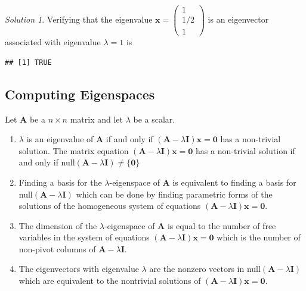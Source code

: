 \documentclass[
]{book}
\newenvironment{Shaded}{\begin{snugshade}}{\end{snugshade}}
\newcommand{\CommentTok}[1]{\textcolor[rgb]{0.56,0.35,0.01}{\textit{#1}}}
\newcommand{\DecValTok}[1]{\textcolor[rgb]{0.00,0.00,0.81}{#1}}
\newcommand{\KeywordTok}[1]{\textcolor[rgb]{0.13,0.29,0.53}{\textbf{#1}}}
\newcommand{\NormalTok}[1]{#1}
\newcommand{\OperatorTok}[1]{\textcolor[rgb]{0.81,0.36,0.00}{\textbf{#1}}}
\newcommand{\StringTok}[1]{\textcolor[rgb]{0.31,0.60,0.02}{#1}}
\theoremstyle{definition}
\theoremstyle{definition}
\theoremstyle{definition}
\theoremstyle{definition}
\theoremstyle{remark}
\newtheorem*{solution}{Solution}
\begin{document}
\begin{solution}
Verifying that the eigenvalue \(\mathbf{x} = \begin{pmatrix} 1 \\ 1/2 \\ 1 \end{pmatrix}\) is an eigenvector associated with eigenvalue \(\lambda = 1\) is

\begin{Shaded}
\end{Shaded}

\begin{verbatim}
## [1] TRUE
\end{verbatim}

\end{solution}

\hypertarget{computing-eigenspaces}{%
\subsection{Computing Eigenspaces}\label{computing-eigenspaces}}

Let \(\mathbf{A}\) be a \(n \times n\) matrix and let \(\lambda\) be a scalar.

\begin{enumerate}
\def\labelenumi{\arabic{enumi})}
\item
  \(\lambda\) is an eigenvalue of \(\mathbf{A}\) if and only if \((\mathbf{A} - \lambda \mathbf{I})\mathbf{x} = \mathbf{0}\) has a non-trivial solution. The matrix equation \((\mathbf{A} - \lambda \mathbf{I})\mathbf{x} = \mathbf{0}\) has a non-trivial solution if and only if null\((\mathbf{A} - \lambda \mathbf{I}) \neq \{\mathbf{0} \}\)
\item
  Finding a basis for the \(\lambda\)-eigenspace of \(\mathbf{A}\) is equivalent to finding a basis for null\((\mathbf{A} - \lambda \mathbf{I})\) which can be done by finding parametric forms of the solutions of the homogeneous system of equations \((\mathbf{A} - \lambda \mathbf{I})\mathbf{x} = \mathbf{0}\).
\item
  The dimension of the \(\lambda\)-eigenspace of \(\mathbf{A}\) is equal to the number of free variables in the system of equations \((\mathbf{A} - \lambda \mathbf{I})\mathbf{x} = \mathbf{0}\) which is the number of non-pivot columns of \(\mathbf{A} - \lambda \mathbf{I}\).
\item
  The eigenvectors with eigenvalue \(\lambda\) are the nonzero vectors in null\((\mathbf{A} - \lambda \mathbf{I})\) which are equivalent to the nontrivial solutions of \((\mathbf{A} - \lambda \mathbf{I})\mathbf{x} = \mathbf{0}\).
\end{enumerate}
\end{document}

